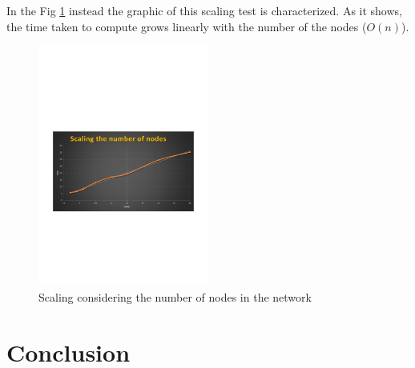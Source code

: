 \documentclass[11pt,conference]{IEEEtran}
\begin{document}
In the Fig \ref{fig:scaling} instead the graphic of this scaling test is characterized. As it shows, the time taken to compute grows linearly with the number of the nodes ($O(n)$).

\begin{figure}[h!]
  \centering
    \includegraphics[trim=0cm 9cm 0cm 11cm, width=0.5\textwidth]{scaling}
    \caption{Scaling considering the number of nodes in the network}
    \label{fig:scaling}
\end{figure}


\section{Conclusion}




\end{document}
